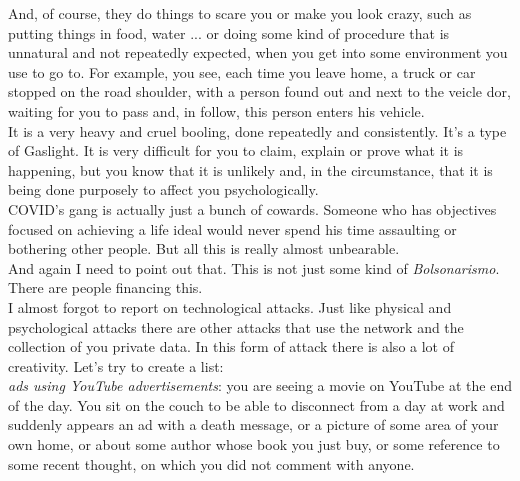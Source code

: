 \documentclass[11pt]{book}
\begin{document}
\noindent And, of course, they do things to scare you or make you look crazy, such as putting things in food, water ... or doing some kind of procedure that is unnatural and not repeatedly expected, when you get into some environment you use to go to. For example, you see, each time you leave home, a truck or car stopped on the road shoulder, with a person found out and next to the veicle dor, waiting for you to pass and, in follow, this person enters his vehicle. \\

\noindent It is a very heavy and cruel booling, done repeatedly and consistently. It's a type of Gaslight. It is very difficult for you to claim, explain or prove what it is happening, but you know that it is unlikely and, in the circumstance, that it is being done purposely to affect you psychologically. \\

\noindent COVID's gang is actually just a bunch of cowards. Someone who has objectives focused on achieving a life ideal would never spend his time assaulting or bothering other people. But all this is really almost unbearable. \\

\noindent And again I need to point out that. This is not just some kind of \emph{Bolsonarismo}. There are people financing this. \\

\noindent I almost forgot to report on technological attacks. Just like physical and psychological attacks there are other attacks that use the network and the collection of you private data. In this form of attack there is also a lot of creativity. Let's try to create a list: \\

\emph{ads using YouTube advertisements}: you are seeing a movie on YouTube at the end of the day. You sit on the couch to be able to disconnect from a day at work and suddenly appears an ad with a death message, or a picture of some area of your own home, or about some author whose book you just buy, or some reference to some recent thought, on which you did not comment with anyone. \\
\end{document}
